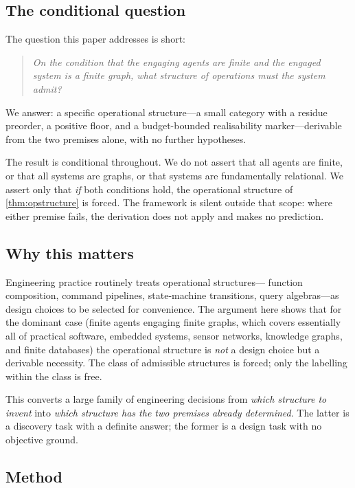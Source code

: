 \documentclass[11pt,a4paper]{article}
\theoremstyle{thmstyle}
\theoremstyle{definition}
\theoremstyle{remark}
\begin{document}
\subsection{The conditional question}

The question this paper addresses is short:
\begin{quote}\itshape
On the condition that the engaging agents are finite and the engaged
system is a finite graph, what structure of operations must the
system admit?
\end{quote}
We answer: a specific operational structure---a small category
with a residue preorder, a positive floor, and a budget-bounded
realisability marker---derivable from the two premises alone, with
no further hypotheses.

The result is conditional throughout. We do not assert that all
agents are finite, or that all systems are graphs, or that systems
are fundamentally relational. We assert only that \emph{if} both
conditions hold, the operational structure of
\cref{thm:opstructure} is forced. The framework is silent outside
that scope: where either premise fails, the derivation does not
apply and makes no prediction.

\subsection{Why this matters}

Engineering practice routinely treats operational structures---
function composition, command pipelines, state-machine transitions,
query algebras---as design choices to be selected for convenience.
The argument here shows that for the dominant case (finite agents
engaging finite graphs, which covers essentially all of practical
software, embedded systems, sensor networks, knowledge graphs, and
finite databases) the operational structure is \emph{not} a design
choice but a derivable necessity. The class of admissible structures
is forced; only the labelling within the class is free.

This converts a large family of engineering decisions from
\emph{which structure to invent} into \emph{which structure has the
two premises already determined}. The latter is a discovery task
with a definite answer; the former is a design task with no
objective ground.

\subsection{Method}
\end{document}
